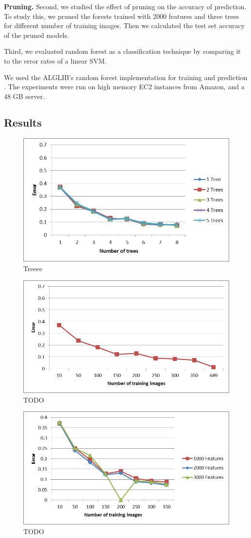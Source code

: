 \textbf{Pruning.} Second, we studied the effect of pruning on the accuracy of prediction. To study this, we pruned the forests trained with 2000 features and three trees for different number of training images. Then we calculated the test set accuracy of the pruned models.

 Third, we evaluated random forest as a classification technique by comparing it to the error rates of a linear SVM. 

We used the ALGLIB's random forest implementation for training and prediction \cite{alglib}. The experiments were run on high memory EC2 instances from Amazon, and a 48 GB server. 


\subsection{Results}
\begin{figure}
\begin{center}
\includegraphics[width=0.45 \textwidth]{fig/varytrees.png}
\end{center}
\caption{Treeee}
\label{fig:varytrees}
\end{figure}

\begin{figure}
\begin{center}
\includegraphics[width=0.45 \textwidth]{fig/largetraining.png}
\end{center}
\caption{TODO}
\label{fig:largetraining}
\end{figure}

\begin{figure}
\begin{center}
\includegraphics[width=0.45 \textwidth]{fig/varyfeatures.png}
\end{center}
\caption{TODO}
\label{fig:varyfeatures}
\end{figure}


